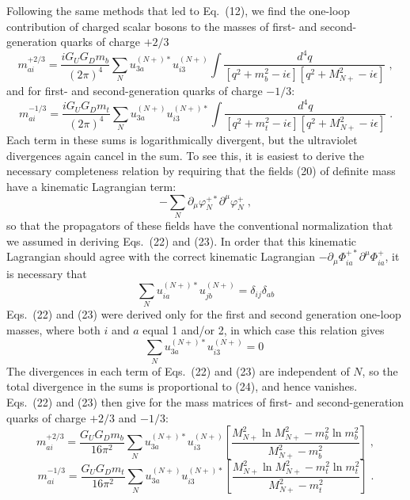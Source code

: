 \documentclass[12pt]{article}
\begin{document}
  Following the same methods that led to Eq.~(12), we find the one-loop contribution of charged scalar bosons to the masses of first- and second-generation quarks of charge $+2/3$
\begin{equation}
m^{+2/3}_{ai}=\frac{iG_UG_Dm_b}{(2\pi)^4}\sum_{N}  u_{3a}^{(N+)*}u_{i3}^{(N+)} \int \frac{d^4q}{[q^2+m_b^2-i\epsilon][q^2+M_{N+}^2-i\epsilon]}\;,
\end{equation}
and for first- and second-generation quarks of charge $-1/3$:
\begin{equation}
m^{-1/3}_{ai}=\frac{iG_UG_Dm_t}{(2\pi)^4}\sum_{N}  u_{3a}^{(N+)}u_{i3}^{(N+)*} \int \frac{d^4q}{[q^2+m_t^2-i\epsilon][q^2+M_{N+}^2-i\epsilon]}\;.
\end{equation}
Each term in these sums is logarithmically divergent, but the ultraviolet divergences again cancel in the sum.  To see this, it  is easiest to derive the necessary completeness relation by  requiring that the fields (20) of definite mass have a kinematic Lagrangian term: 
$$-\sum_N\partial_\mu\varphi^{+*}_N\partial^\mu\varphi^+_N\;,$$
so that the propagators of these fields have the conventional normalization that we assumed in deriving Eqs.~(22) and (23).  In order that this kinematic Lagrangian should agree with the correct kinematic Lagrangian $-\partial_\mu\Phi^{+*}_{ia}\partial^\mu\Phi^{+}_{ia}$, it is necessary that
$$
\sum_{N}  u_{ia}^{(N+)*}u_{jb}^{(N+)}=\delta_{ij}\delta_{ab}
$$
Eqs.~(22) and (23) were derived only for the first and second generation one-loop masses,  where both $i$ and $a$ equal 1 and/or 2, in which case this relation  gives
\begin{equation}
\sum_{N}  u_{3a}^{(N+)*}u_{i3}^{(N+)}=0\;
\end{equation}
The divergences in each term of Eqs.~(22) and (23) are independent of $N$, so the total divergence in the sums is proportional to (24), and hence vanishes.
Eqs.~(22) and (23) then give for the mass matrices of first- and second-generation quarks of charge $+2/3$ and $-1/3$:
\begin{equation}
m^{+2/3}_{ai}=\frac{G_UG_Dm_b}{16\pi^2}\sum_{N}  u_{3a}^{(N+)*}u_{i3}^{(N+)}\left[\frac{M_{N+}^2\ln M_{N+}^2-m_b^2\ln m_b^2}{M_{N+}^2-m_b^2}
\right] \;,
\end{equation}
\begin{equation}
m^{-1/3}_{ai}=\frac{G_UG_Dm_t}{16 \pi^2}\sum_{N}  u_{3a}^{(N+)}u_{i3}^{(N+)*}\left[\frac{M_{N+}^2\ln M_{N+}^2-m_t^2\ln m_t^2}{M_{N+}^2-m_t^2}\right]
 \;.
\end{equation}
\end{document}
